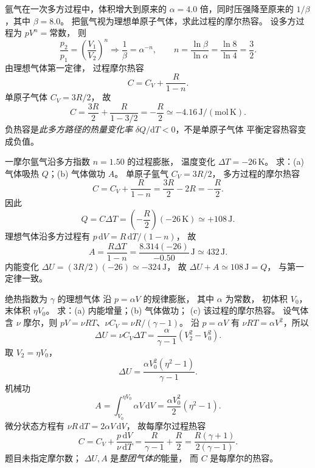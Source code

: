 氩气在一次多方过程中，体积增大到原来的
$\alpha=4.0$ 倍，同时压强降至原来的
$1/\beta$，其中 $\beta=8.0$。
把氩气视为理想单原子气体，求此过程的摩尔热容。
\exsolution
设多方过程为 $pV^n=\text{常数}$，
则
\[
\frac{p_2}{p_1}=\left(\frac{V_1}{V_2}\right)^n
\Longrightarrow \frac1\beta=\alpha^{-n},\qquad
n=\frac{\ln\beta}{\ln\alpha}
=\frac{\ln8}{\ln4}=\frac32.
\]
由理想气体第一定律，
过程摩尔热容
\[
C=C_V+\frac{R}{1-n}.
\]
单原子气体 $C_V=3R/2$，
故
\[
\boxed{C=\frac{3R}{2}+\frac{R}{1-3/2}
=-\frac R2\simeq-4.16\,\mathrm{J/(mol\,K)}}.
\]
\excheck 负热容是\emph{此多方路径的热量变化率}
$\delta Q/\mathrm dT<0$，不是单原子气体
平衡定容热容变成负值。

一摩尔氩气沿多方指数 $n=1.50$ 的过程膨胀，
温度变化 $\Delta T=-26\,\mathrm K$。
求：(a) 气体吸热 $Q$；(b) 气体做功 $A$。
\exsolution
单原子氩气 $C_V=3R/2$，
多方过程的摩尔热容
\[
C=C_V+\frac R{1-n}
=\frac{3R}{2}-2R=-\frac R2.
\]
因此
\[
\boxed{Q=C\Delta T
=\left(-\frac R2\right)(-26\,\mathrm K)
\simeq+108\,\mathrm J}.
\]
理想气体沿多方过程有
$p\,\mathrm dV=R\,\mathrm dT/(1-n)$，
故
\[
\boxed{A=\frac{R\Delta T}{1-n}
=\frac{8.314(-26)}{-0.50}\,\mathrm J
\simeq432\,\mathrm J}.
\]
\excheck 内能变化
$\Delta U=(3R/2)(-26)\simeq-324\,\mathrm J$，
故 $\Delta U+A\simeq108\,\mathrm J=Q$，
与第一定律一致。

绝热指数为 $\gamma$ 的理想气体
沿 $p=\alpha V$ 的规律膨胀，
其中 $\alpha$ 为常数，
初体积 $V_0$，末体积 $\eta V_0$。
求：(a) 内能增量；(b) 气体做功；
(c) 该过程的摩尔热容。
\exsolution
设气体含 $\nu$ 摩尔，则
$pV=\nu RT$、$\nu C_V=\nu R/(\gamma-1)$。
沿 $p=\alpha V$ 有
$\nu RT=\alpha V^2$，所以
\[
\Delta U=\nu C_V\Delta T
=\frac{\alpha}{\gamma-1}(V_2^2-V_0^2).
\]
取 $V_2=\eta V_0$，
\[
\boxed{\Delta U=
\frac{\alpha V_0^2(\eta^2-1)}{\gamma-1}}.
\]
机械功
\[
\boxed{A=\int_{V_0}^{\eta V_0}\alpha V\,\mathrm dV
=\frac{\alpha V_0^2}{2}(\eta^2-1)}.
\]
微分状态方程有
$\nu R\,\mathrm dT=2\alpha V\,\mathrm dV$，
故每摩尔过程热容
\[
C=C_V+\frac{p\,\mathrm dV}{\nu\,\mathrm dT}
=\frac R{\gamma-1}+\frac R2
=\boxed{\frac{R(\gamma+1)}{2(\gamma-1)}}.
\]
\excheck 题目未指定摩尔数；
$\Delta U,A$ 是\emph{整团气体的}能量，
而 $C$ 是每摩尔的热容。

